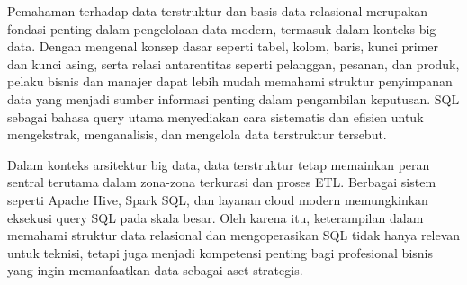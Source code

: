 Pemahaman terhadap data terstruktur dan basis data relasional merupakan fondasi penting dalam pengelolaan data modern, termasuk dalam konteks big data. Dengan mengenal konsep dasar seperti tabel, kolom, baris, kunci primer dan kunci asing, serta relasi antarentitas seperti pelanggan, pesanan, dan produk, pelaku bisnis dan manajer dapat lebih mudah memahami struktur penyimpanan data yang menjadi sumber informasi penting dalam pengambilan keputusan. SQL sebagai bahasa query utama menyediakan cara sistematis dan efisien untuk mengekstrak, menganalisis, dan mengelola data terstruktur tersebut.

Dalam konteks arsitektur big data, data terstruktur tetap memainkan peran sentral terutama dalam zona-zona terkurasi dan proses ETL. Berbagai sistem seperti Apache Hive, Spark SQL, dan layanan cloud modern memungkinkan eksekusi query SQL pada skala besar. Oleh karena itu, keterampilan dalam memahami struktur data relasional dan mengoperasikan SQL tidak hanya relevan untuk teknisi, tetapi juga menjadi kompetensi penting bagi profesional bisnis yang ingin memanfaatkan data sebagai aset strategis.


